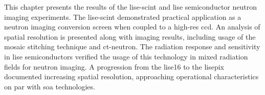 \documentclass[../../main.tex]{subfiles}%
\begin{document}
%
    \Xsection%
    This chapter presents the results of the \gls{lise-scint} and \gls{lise} semiconductor neutron imaging experiments.
    The \gls{lise-scint} demonstrated practical application as a neutron imaging conversion screen when coupled to a \gls{high-res} \gls{ccd}.
    An analysis of spatial resolution is presented along with imaging results, including usage of the mosaic stitching technique and \gls{ct-neutron}.
    The radiation response and sensitivity in \gls{lise} semiconductors verified the usage of this technology in mixed radiation fields for neutron imaging.
    A progression from the \gls{lise16} to the \gls{lisepix} documented increasing spatial resolution, approaching operational characteristics on par with \gls{soa} technologies.
\end{document}
